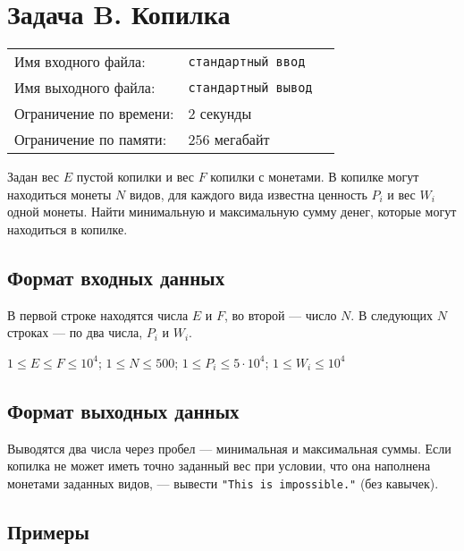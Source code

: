 \documentclass[12pt]{scrartcl}
\newcommand{\inputFile}{стандартный ввод}
\newcommand{\outputFile}{стандартный вывод}
\begin{document}
\section*{Задача B. Копилка}

\begin{tabularx}{\textwidth}{l l X}
    Имя входного файла: & \texttt{\inputFile} \\
    Имя выходного файла: & \texttt{\outputFile} \\
    Ограничение по времени: & $2$ секунды \\
    Ограничение по памяти: & $256$ мегабайт \\
\end{tabularx}

Задан вес $E$ пустой копилки и вес $F$ копилки с монетами.
В копилке могут находиться монеты $N$ видов, для каждого вида известна ценность $P_i$ и вес $W_i$ одной монеты.
Найти минимальную и максимальную сумму денег, которые могут находиться в копилке.

\subsection*{Формат входных данных}
В первой строке находятся числа $E$ и $F$, во второй --- число $N$.
В следующих $N$ строках --- по два числа, $P_i$ и $W_i$.

$1 \le E \le F \le 10^4$; $1 \le N \le 500$; $1 \le P_i \le 5 \cdot 10^4$; $1 \le W_i \le 10^4$

\subsection*{Формат выходных данных}
Выводятся два числа через пробел --- минимальная и максимальная суммы.
Если копилка не может иметь точно заданный вес при условии,
что она наполнена монетами заданных видов, --- вывести \texttt{"This is impossible."} (без кавычек).

\subsection*{Примеры}
\end{document}
